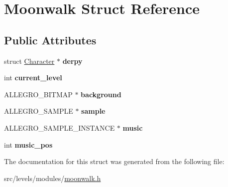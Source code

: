 \hypertarget{structMoonwalk}{\section{Moonwalk Struct Reference}
\label{structMoonwalk}
}
\subsection*{Public Attributes}
\begin{DoxyCompactItemize}
\item 
\hypertarget{structMoonwalk_aa1a82f9925aedc11250230a33eb993d1}{struct \hyperlink{structCharacter}{Character} $\ast$ {\bfseries derpy}}\label{structMoonwalk_aa1a82f9925aedc11250230a33eb993d1}

\item 
\hypertarget{structMoonwalk_a841870902dfd149bb19576a64e0ae8bf}{int {\bfseries current\+\_\+level}}\label{structMoonwalk_a841870902dfd149bb19576a64e0ae8bf}

\item 
\hypertarget{structMoonwalk_aaa1580b933a775c4b77c532947f6884d}{A\+L\+L\+E\+G\+R\+O\+\_\+\+B\+I\+T\+M\+A\+P $\ast$ {\bfseries background}}\label{structMoonwalk_aaa1580b933a775c4b77c532947f6884d}

\item 
\hypertarget{structMoonwalk_ad571d5510f475b348c88b181582fac38}{A\+L\+L\+E\+G\+R\+O\+\_\+\+S\+A\+M\+P\+L\+E $\ast$ {\bfseries sample}}\label{structMoonwalk_ad571d5510f475b348c88b181582fac38}

\item 
\hypertarget{structMoonwalk_a16c5c846f0db75dac28d05b3b96cd4b1}{A\+L\+L\+E\+G\+R\+O\+\_\+\+S\+A\+M\+P\+L\+E\+\_\+\+I\+N\+S\+T\+A\+N\+C\+E $\ast$ {\bfseries music}}\label{structMoonwalk_a16c5c846f0db75dac28d05b3b96cd4b1}

\item 
\hypertarget{structMoonwalk_a6f0d0537ee7e6fbef839dfc2e53def6c}{int {\bfseries music\+\_\+pos}}\label{structMoonwalk_a6f0d0537ee7e6fbef839dfc2e53def6c}

\end{DoxyCompactItemize}


The documentation for this struct was generated from the following file\+:\begin{DoxyCompactItemize}
\item 
src/levels/modules/\hyperlink{moonwalk_8h}{moonwalk.\+h}\end{DoxyCompactItemize}
